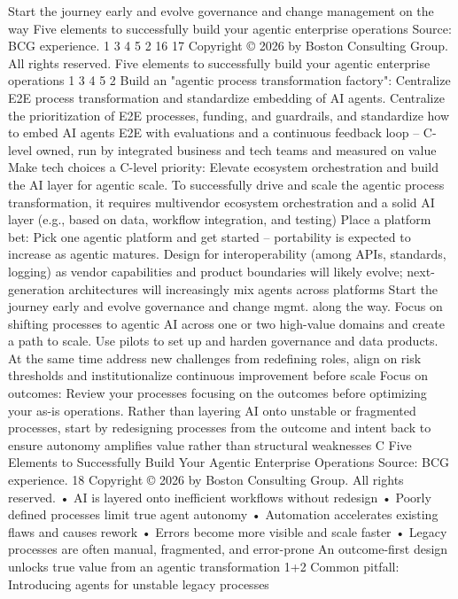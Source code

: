 Start the journey early and evolve governance and change
management on the way
Five elements
to successfully
build your
agentic
enterprise
operations
Source: BCG experience.
1
3
4
5
2
16
17
Copyright © 2026 by Boston Consulting Group. All rights reserved.
Five elements to successfully build your agentic enterprise operations
1
3
4
5
2
Build an "agentic process transformation factory": Centralize E2E process transformation and standardize embedding of AI
agents. Centralize the prioritization of E2E processes, funding, and guardrails, and standardize how to embed AI agents E2E with
evaluations and a continuous feedback loop – C-level owned, run by integrated business and tech teams and measured on value
Make tech choices a C-level priority: Elevate ecosystem orchestration and build the AI layer for agentic scale. To successfully
drive and scale the agentic process transformation, it requires multivendor ecosystem orchestration and a solid AI layer (e.g., based on
data, workflow integration, and testing)
Place a platform bet: Pick one agentic platform and get started – portability is expected to increase as agentic matures.
Design for interoperability (among APIs, standards, logging) as vendor capabilities and product boundaries will likely evolve; next-
generation architectures will increasingly mix agents across platforms
Start the journey early and evolve governance and change mgmt. along the way. Focus on shifting processes to agentic AI across
one or two high-value domains and create a path to scale. Use pilots to set up and harden governance and data products. At the same
time address new challenges from redefining roles, align on risk thresholds and institutionalize continuous improvement before scale
Focus on outcomes: Review your processes focusing on the outcomes before optimizing your as-is operations. Rather than
layering AI onto unstable or fragmented processes, start by redesigning processes from the outcome and intent back to ensure
autonomy amplifies value rather than structural weaknesses
C
Five Elements to Successfully Build Your Agentic Enterprise Operations
Source: BCG experience.
18
Copyright © 2026 by Boston Consulting Group. All rights reserved.
•
AI is layered onto inefficient
workflows without redesign
•
Poorly defined processes limit true
agent autonomy
•
Automation accelerates existing
flaws and causes rework
•
Errors become more visible and
scale faster
•
Legacy processes are often manual,
fragmented, and error-prone
An outcome-first design unlocks true value from an agentic transformation
1+2
Common pitfall: Introducing agents
for unstable legacy processes
